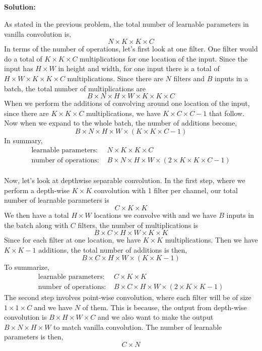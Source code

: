 \documentclass{article}
\newenvironment{solution}
  {\par\noindent\textbf{Solution:}\par}
  {\par}
\begin{document}
\subsection{}
\begin{solution}
  As stated in the previous problem, the total number of learnable parameters in vanilla convolution is, 
  \[ 
    N \times K \times K \times C
  \]
  In terms of the number of operations, let's first look at one filter. 
  One filter would do a total of $K \times K \times C$ multiplications for one location of the input. Since the input has $H \times W$ in height and width, for one input there is a total of 
  $H \times W \times K \times K \times C$ multiplications. Since there are $N$ filters and $B$ inputs in a batch, the total number of multiplications are 
  \[ B \times N \times H \times W \times K \times K \times C  \]
  When we perform the additions of convolving around one location of the input, since there are $K \times K \times C$ multiplications, we have $K \times C \times C - 1$ that follow.
  Now when we expand to the whole batch, the number of additions become,
  \[
    B \times N \times H \times W \times (K \times  K \times C - 1)
  \]
  In summary,
  \[
    \begin{aligned}
      \text{learnable parameters: }&N\times K \times K \times C \\ 
      \text{number of operations: } &B \times N \times H \times W \times (2 \times K \times K \times C - 1)
    \end{aligned}
  \]
  \\
  Now, let's look at depthwise separable convolution. In the first step, where we perform a depth-wise $K\times K$  convolution with 1 filter per channel,
  our total number of learnable parameters is 
  \[
    C \times K \times K
  \]
  We then have a total $ H \times W$ locations we convolve with and we have $B$ inputs in the batch along with $C$ filters, the number of multiplications is 
  \[ B \times C \times H \times W \times K \times K\]
  Since for each filter at one location, we have $K \times K$ multiplications. Then we have $K \times K - 1$ additions, the total number of additions is then, 
  \[ B \times C \times H \times W \times (K \times K - 1) \]
  To summarize,
  \[
    \begin{aligned}
      \text{learnable parameters: }& C \times K \times K \\ 
      \text{number of operations: } &B \times C \times H \times W \times (2 \times K \times K - 1)
    \end{aligned}
  \]
The second step involves point-wise convolution, where each filter will be of size $1 \times 1 \times C$ and we have $N$ of them.
This is because, the output from depth-wise convolution is $B \times H \times W \times C$ 
and we also want to make the output $B \times N \times H \times W$ to match vanilla convolution.
The number of learnable parameters is then, 
\[ C \times N \]


\end{solution}
\end{document}
